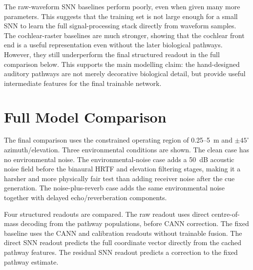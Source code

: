 The raw-waveform SNN baselines perform poorly, even when given many more parameters. This suggests that the training set is not large enough for a small SNN to learn the full signal-processing stack directly from waveform samples. The cochlear-raster baselines are much stronger, showing that the cochlear front end is a useful representation even without the later biological pathways. However, they still underperform the final structured readout in the full comparison below. This supports the main modelling claim: the hand-designed auditory pathways are not merely decorative biological detail, but provide useful intermediate features for the final trainable network.



\section{Full Model Comparison}

The final comparison uses the constrained operating region of 0.25--5~m and $\pm45^\circ$ azimuth/elevation. Three environmental conditions are shown. The clean case has no environmental noise. The environmental-noise case adds a 50~dB acoustic noise field before the binaural HRTF and elevation filtering stages, making it a harsher and more physically fair test than adding receiver noise after the cue generation. The noise-plus-reverb case adds the same environmental noise together with delayed echo/reverberation components.

Four structured readouts are compared. The raw readout uses direct centre-of-mass decoding from the pathway populations, before CANN correction. The fixed baseline uses the CANN and calibration readouts without trainable fusion. The direct SNN readout predicts the full coordinate vector directly from the cached pathway features. The residual SNN readout predicts a correction to the fixed pathway estimate.


